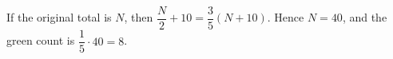 If the original total is $N$, then $\dfrac{N}{2}+10=\dfrac{3}{5}(N+10)$. Hence $N=40$, and the green count is $\dfrac{1}{5}\cdot40=\boxed8$.

